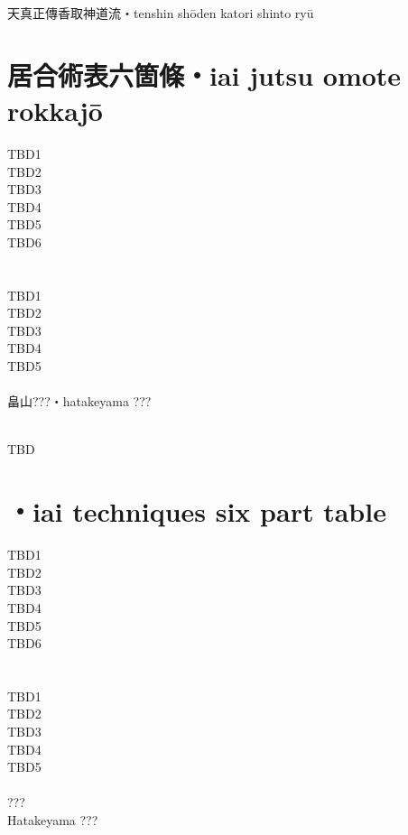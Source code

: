 \documentclass[dvipdfmx, a4paper, 12pt]{utarticle}
\begin{document}
\begin{CJK*}{UTF8}{min}
\begin{landscape}
\setcounter{section}{0}
\newpage
\pagestyle{empty}
天真正傳香取神道流・tenshin sh\={o}den katori shinto ry\={u}
\section{居合術表六箇條・iai jutsu omote rokkaj\={o}}
\noindent TBD1\\
TBD2\\
TBD3\\
TBD4\\
TBD5\\
TBD6\\
\section{}
\noindent TBD1\\
TBD2\\
TBD3\\
TBD4\\
TBD5\\
\\
畠山???・hatakeyama ???

\setcounter{section}{0}
\newpage
\pagestyle{empty}
\\
TBD
\section{・iai techniques six part table}
\noindent TBD1\\
TBD2\\
TBD3\\
TBD4\\
TBD5\\
TBD6\\
\section{}
\noindent TBD1\\
TBD2\\
TBD3\\
TBD4\\
TBD5\\
\\
???\\
Hatakeyama ???


\end{landscape}
\end{CJK*}
\end{document}
